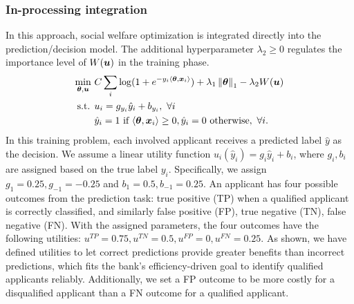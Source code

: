 \documentclass{article}[11pt]
\begin{document}
\subsubsection*{In-processing integration}
In this approach, social welfare optimization is integrated directly into the prediction/decision model. The additional hyperparameter $\lambda_2 \geq 0$ regulates the importance level of $W(\bm{u})$ in the training phase. 
\begin{gather} \label{sys:lr-inte}
    \begin{aligned}
    \min_{\bm{\theta}, \bm{u}} ~ & C\sum_i \log(1+e^{-y_i\langle \bm{\theta}, \bm{x}_i\rangle}) + \lambda_1 \left\lVert\bm{\theta}\right\rVert_1 - \lambda_2 W(\bm{u}) \\
   \text{s.t. } & u_i = g_{y_i} \hat{y}_i + b_{y_i}, ~\forall i \\
    & \hat{y}_i = 1 \text{ if } \langle \bm{\theta}, \bm{x}_i \rangle \geq 0, \hat{y}_i = 0 \text{ otherwise}, ~\forall i.
    \end{aligned}
\end{gather}
In this training problem, each involved applicant receives a predicted label $\hat{y}$ as the decision. We assume a linear utility function $u_i(\hat{y}_i) = g_i \hat{y}_i + b_i$, where $g_i, b_i$ are assigned based on the true label $y_i$. Specifically, we assign $g_1=0.25, g_{-1}=-0.25$ and $b_1 = 0.5, b_{-1}=0.25$.
An applicant has four possible outcomes from the prediction task: true positive (TP) when a qualified applicant is correctly classified, and similarly false positive (FP), true negative (TN), false negative (FN). With the assigned parameters, the four outcomes have the following utilities: $u^{TP} = 0.75, u^{TN}=0.5, u^{FP}=0, u^{FN}=0.25$. As shown, we have defined utilities to let correct predictions provide greater benefits than incorrect predictions, which fits the bank's efficiency-driven goal to identify qualified applicants reliably. Additionally, we set a FP outcome to be more costly for a disqualified applicant than a FN outcome for a qualified applicant. 
\end{document}
